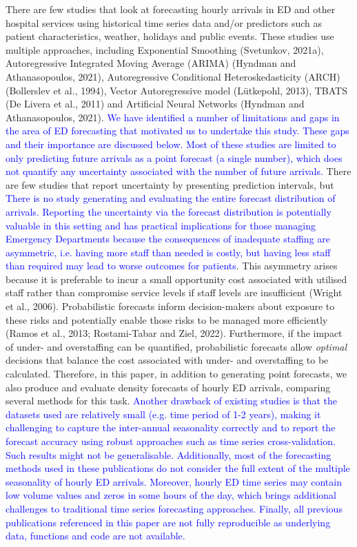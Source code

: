 \documentclass[]{elsarticle} %
\begin{document}
There are few studies that look at forecasting hourly arrivals in ED and
other hospital services using historical time series data and/or
predictors such as patient characteristics, weather, holidays and public
events. These studies use multiple approaches, including Exponential
Smoothing (Svetunkov, 2021a), Autoregressive Integrated Moving Average
(ARIMA) (Hyndman and Athanasopoulos, 2021), Autoregressive Conditional
Heteroskedasticity (ARCH) (Bollerslev et al., 1994), Vector Autoregressive
model (Lütkepohl, 2013), TBATS (De Livera et al., 2011) and Artificial
Neural Networks (Hyndman and Athanasopoulos, 2021). \textcolor{blue}{We have identified a number of limitations and gaps in the area of ED forecasting that motivated us to undertake this study. These gaps and their importance are discussed below.} \textcolor{blue}{Most of these studies are limited to only predicting future arrivals as a point
forecast (a single number), which does not quantify any uncertainty associated with the number of future arrivals.} There are few studies that report uncertainty by presenting prediction intervals, but \textcolor{blue}{There is no study generating and evaluating the entire forecast distribution of arrivals. Reporting the uncertainty via the forecast distribution is potentially valuable in this setting and has practical implications for those managing Emergency Departments because the consequences of inadequate staffing are asymmetric, i.e. having more staff than needed is costly, but
having less staff than required may lead to worse outcomes for patients}. This asymmetry arises because it is preferable to incur a small opportunity cost associated with utilised staff rather than compromise service levels if staff levels are insufficient (Wright et al., 2006). Probabilistic forecasts inform decision-makers about exposure to these risks and potentially enable those risks to be managed more efficiently (Ramos et al., 2013; Rostami-Tabar and Ziel, 2022). Furthermore, if the impact of under- and overstaffing can be quantified,
probabilistic forecasts allow \emph{optimal} decisions that balance the cost associated with under- and overstaffing to be calculated. Therefore, in this paper, in addition to generating point forecasts, we also produce and evaluate density forecasts of hourly ED arrivals, comparing several methods for this task. \textcolor{blue}{Another drawback of existing studies is that the datasets used are relatively small (e.g. time period of 1-2 years), making it challenging to capture the inter-annual seasonality correctly and to report the forecast accuracy using robust approaches such as time series cross-validation. Such results might not be generalisable. Additionally, most of the forecasting methods used in these publications do not consider the full extent of the multiple seasonality of hourly ED arrivals. Moreover, hourly ED time series may contain low volume values and zeros in some hours of the day, which brings additional challenges to traditional time series forecasting approaches. Finally, all previous publications referenced in this paper are not fully reproducible as underlying data, functions and code are not available.}
\end{document}
